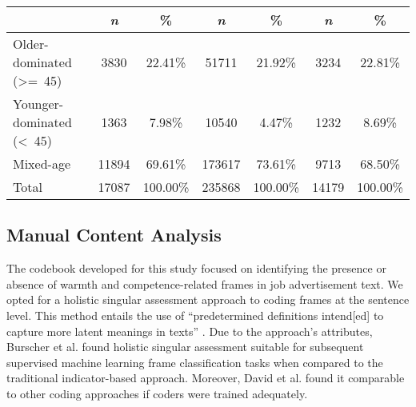 \documentclass[jou]{apa7}
\begin{document}
\begin{table*}[htbp]
\begin{threeparttable}
\begin{tabular}[]{@{}lcccccc@{}}
            \cmidrule(l){2-7}
            &
            \textit{n} & \% & \textit{n} & \% & \textit{n} & \%\\
            \midrule
            \makecell[l]{Older-dominated\\(\textgreater{}=\ 45)} & 3830 & 22.41\% & 51711 & 21.92\% & 3234 & 22.81\%\\
            \makecell[l]{Younger-dominated\\(\textless\ 45)} & 1363 & 7.98\% & 10540 & 4.47\% & 1232 & 8.69\%\\
            Mixed-age & 11894 & 69.61\% & 173617 & 73.61\% & 9713 & 68.50\%\\
            \midrule
            Total & 17087 & 100.00\% & 235868 & 100.00\% & 14179 & 100.00\%\\
            \bottomrule
            \end{tabular}
        \end{threeparttable}
    \end{table*}

\subsection{Manual Content Analysis}
\label{manual_content_analysis}
The codebook developed for this study focused on identifying the presence or absence of warmth and competence-related frames in job advertisement text. We opted for a holistic singular assessment approach to coding frames at the sentence level. This method entails the use of “predetermined definitions intend[ed] to capture more latent meanings in texts” \parencite[][p. 332]{davidFindingFramesComparing2011}. Due to the approach’s attributes, Burscher et al. \parencite{burscherTeachingComputerCode2014} found holistic singular assessment suitable for subsequent supervised machine learning frame classification tasks when compared to the traditional indicator-based approach. Moreover, David et al. \parencite{davidFindingFramesComparing2011} found it comparable to other coding approaches if coders were trained adequately.
\end{document}
